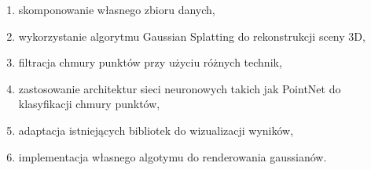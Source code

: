 \begin{enumerate}
    \item skomponowanie własnego zbioru danych, 
    \item wykorzystanie algorytmu Gaussian Splatting do rekonstrukcji sceny 3D,
    \item filtracja chmury punktów przy użyciu różnych technik, 
    \item zastosowanie architektur sieci neuronowych takich jak PointNet do klasyfikacji chmury punktów, 
    \item adaptacja istniejących bibliotek do wizualizacji wyników, 
    \item implementacja własnego algotymu do renderowania gaussianów.
\end{enumerate}